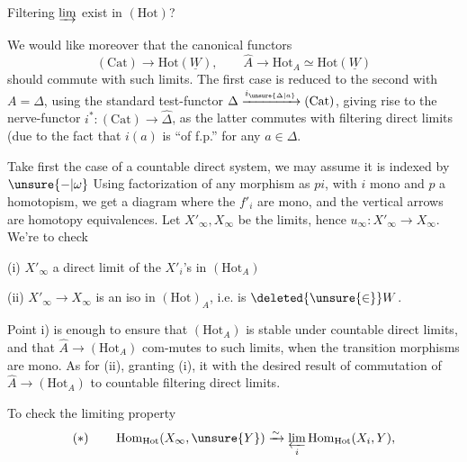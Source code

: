Filtering $\varinjlim$ exist in $(\mathrm{Hot})$?

We would like moreover that the canonical functors
\[
(\mathrm{Cat})\longrightarrow\mathrm{Hot}(\underline W),\qquad\widehat A\longrightarrow\mathrm{Hot}_A\simeq\mathrm{Hot}(\underline W)
\]
should commute with such limits. The first case is reduced to the second with $A=\Delta$, using the standard test-functor $\Delta\xrightarrow{i_{\unsure{\Delta|a}}}(\mathrm{Cat})$, giving rise to the nerve-functor $i^*:(\mathrm{Cat})\longrightarrow\widehat\Delta$, as the latter commutes with filtering direct limits (due to the fact that $i(a)$ is ``of f.p.'' for any $a\in\Delta$.

Take first the case of a countable direct system, we may assume it is indexed by $\unsure{-|\omega}$
Using factorization of any morphism as $pi$, with $i$ mono and $p$ a homotopism, we get a diagram
where the $f'_i$ are mono, and the vertical arrows are homotopy equivalences. Let $X'_\infty,X_\infty$ be the limits, hence $u_\infty:X'_\infty\longrightarrow X_\infty$. We're to check

(i) $X'_\infty$  a direct limit of the $X'_i$'s in $(\mathrm{Hot}_A)$

(ii) $X'_\infty\longrightarrow X_\infty$ is an iso in $(\mathrm{Hot})_A$, i.e. is $\deleted{\unsure{\in}}W$.

Point i) is enough  to ensure that $(\mathrm{Hot}_A)$ is stable under countable  direct limits, and that $\widehat A\longrightarrow(\mathrm{Hot}_A)$ com-mutes to such limits, when the transition morphisms are mono.  As for (ii), granting (i), it  with the desired result of commutation of $\widehat A\longrightarrow(\mathrm{Hot}_A)$ to countable filtering direct limits.

To check the limiting property
\[
(*)\qquad\operatorname{Hom}_{\mathrm{Hot}}(X_\infty,\unsure{Y})\xrightarrow{\sim}\varprojlim_i\operatorname{Hom}_{\mathrm{Hot}}(X_i,Y),
\]
